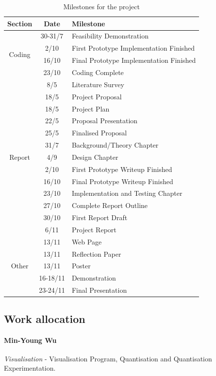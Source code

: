 \documentclass[a4paper,twocolumn]{article}
\begin{document}
\begin{table}
  \centering

  \begin{tabular}{|c|c|p{4cm}|}
    \hline
    \textbf{Section} & \textbf{Date} & \textbf{Milestone} \\
    \hline \hline
    \multirow{4}{*}{Coding} & 30-31/7 & Feasibility Demonstration \\
 & 2/10 & First Prototype Implementation Finished \\
 & 16/10 & Final Prototype Implementation Finished \\
 & 23/10 & Coding Complete \\
 \hline
 \multirow{13}{*}{Report} & 8/5 & Literature Survey \\
 & 18/5 & Project Proposal \\
 & 18/5 & Project Plan\\
 & 22/5 & Proposal Presentation \\
 & 25/5 & Finalised Proposal \\
 & 31/7 & Background/Theory Chapter \\
 & 4/9 & Design Chapter \\
 & 2/10 & First Prototype Writeup Finished \\
 & 16/10 & Final Prototype Writeup Finished \\
 & 23/10 & Implementation and Testing Chapter \\
 & 27/10 & Complete Report Outline \\
 & 30/10 & First Report Draft \\
 & 6/11 & Project Report \\
 \hline
 \multirow{5}{*}{Other} & 13/11 & Web Page \\
 & 13/11 & Reflection Paper \\
 & 13/11 & Poster \\
 & 16-18/11 & Demonstration \\
 & 23-24/11 & Final Presentation \\
 \hline

\end{tabular}
\caption{Milestones for the project}
\label{tab:milestones}

\end{table}


\subsection{Work allocation}

\paragraph{Min-Young Wu} \emph{Visualisation} - Visualisation Program,
Quantisation and Quantisation Experimentation.
\end{document}
